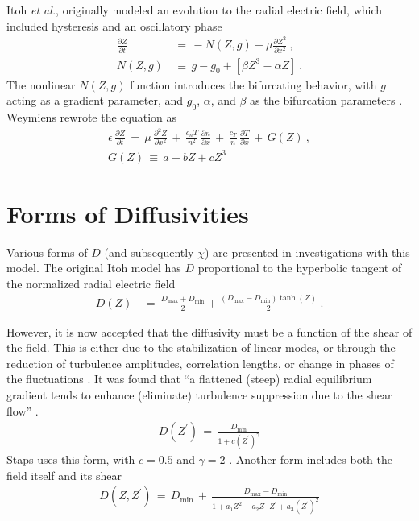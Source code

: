 Itoh \emph{et al.}, originally modeled an evolution to the radial electric field, which included hysteresis and an oscillatory phase \cite{itoh_edge_1991}
\begin{align} %
	\frac{\partial Z}{\partial t} \,&=\, -N(Z,g) + \mu \frac{\partial Z^2}{\partial x^2}~,\label{eq:original_z} \\
	N(Z,g) \,&\equiv\, g - g_0 + \left[\beta Z^3 - \alpha Z\right]~.
\end{align}
The nonlinear $N(Z,g)$ function introduces the bifurcating behavior, with $g$ acting as a gradient parameter, and $g_0$, $\alpha$, and $\beta$ as the bifurcation parameters \cite{itoh_model_1988}.
Weymiens \cite{weymiens_bifurcation_2012} rewrote the equation as
\begin{align} %
	\epsilon \, \frac{\partial Z}{\partial t} \,=\, \mu \, \frac{\partial^2 Z}{\partial x^2} \,+\,
		\frac{c_n T}{n^2} \, \frac{\partial n}{\partial x} \,+\,
		\frac{c_T}{n} \, \frac{\partial T}{\partial x} \,+\, G(Z)~,\label{eq:paquay_Z} \\
	G(Z) \,\equiv\, a + bZ + cZ^3 \label{eq:G_polynomial}
\end{align}

\section{Forms of Diffusivities}\label{sec:diffusivities}
Various forms of $D$ (and subsequently $\chi$) are presented in investigations with this model.
The original Itoh model has $D$ proportional to the hyperbolic tangent of the normalized radial electric field \cite{itoh_edge_1991, zohm_dynamic_1994}
\begin{align} %
	D(Z) \,&=\, \frac{D_\text{max} + D_\text{min}}{2} +
		\frac{(D_\text{max} - D_\text{min})\tanh(Z)}{2}~. \label{eq:Itoh_diffusivity}
\end{align}

However, it is now accepted that the diffusivity must be a function of the shear of the field.
This is either due to the stabilization of linear modes, or through the reduction of turbulence amplitudes, correlation lengths, or change in phases of the fluctuations \cite{connor_review_2000}.
It was found that ``a flattened (steep) radial equilibrium gradient tends to enhance (eliminate) turbulence suppression due to the shear flow'' \cite{zhang_edge_1992}.
\begin{align} %
	D(Z^{\prime}) \,=\, \frac{D_\text{min}}{1 + c(Z^{\prime})^{\gamma}} \label{eq:shear_diffusivity}
\end{align}
Staps uses this form, with $c = 0.5$ and $\gamma = 2$ \cite{staps_backstepping_2017}.
Another form includes both the field itself and its shear \cite{paquay_studying_2012}
\begin{align} %
	D(Z, Z^{\prime}) \,=\, D_\text{min} \,+\,
		\frac{D_\text{max} - D_\text{min}}{1 + a_1 Z^2 + a_2 Z \cdot Z^{\prime}
		+ a_3 (Z^{\prime})^2} \label{eq:flow_shear_diffusivity}
\end{align}

